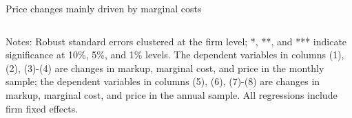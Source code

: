 \documentclass[10pt]{beamer}
\begin{document}
\begin{frame}{Price changes mainly driven by marginal costs}
\begin{table}[htbp]
{\begin{threeparttable}
\begin{tabular}{lcccccccc}
            \bottomrule
        \end{tabular}
        \begin{tablenotes}
            \footnotesize
            \item Notes: Robust standard errors clustered at the firm level;  *, **, and *** indicate significance at 10\%, 5\%, and 1\% levels. The dependent variables in columns (1), (2), (3)-(4) are changes in markup, marginal cost, and price in the monthly sample; the dependent variables in columns (5), (6), (7)-(8) are changes in markup, marginal cost, and price in the annual sample. All regressions include firm fixed effects.
        \end{tablenotes}
        \end{threeparttable}
        }
    \end{table}
    \hyperlink{borrowing_cost}{}
\end{frame}
\end{document}
